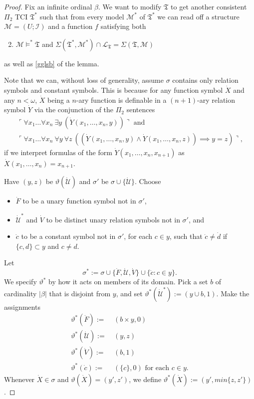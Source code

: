 \documentclass[12pt, twoside]{memoir}
\numberwithin{equation}{section}
\theoremstyle{definition}
\theoremstyle{remark}
\theoremstyle{definition}
\theoremstyle{definition}
\theoremstyle{definition}
\theoremstyle{remark}
\begin{document}
\begin{proof}
Fix an infinite ordinal $\beta$. We want to modify $\mathfrak{T}$ to get another consistent $\Pi_2$ TCI $\mathfrak{T}^*$ such that from every model $\mathcal{M}^*$ of $\mathfrak{T}^*$ we can read off a structure $\mathcal{M} = (U; \mathcal{I})$ and a function $f$ satisfying both
\begin{enumerate}[label=(\alph*)']
    \setcounter{enumi}{1}
    \item\label{gglsb'} $\mathcal{M} \models^* \mathfrak{T}$ and $\Sigma(\mathfrak{T}^*, \mathcal{M}^*) \cap \mathcal{L}_{\mathfrak{T}} = \Sigma(\mathfrak{T}, \mathcal{M})$
\end{enumerate}
as well as \ref{gglsb} of the lemma. 

Note that we can, without loss of generality, assume $\sigma$ contains only relation symbols and constant symbols. This is because for any function symbol $\dot{X}$ and any $n < \omega$, $\dot{X}$ being a $n$-ary function is definable in a $(n+1)$-ary relation symbol $\dot{Y}$ via the conjunction of the $\Pi_2$ sentences
\begin{gather*}
    \ulcorner \forall x_1 \dots \forall x_n \ \exists y \ (\dot{Y}(x_1, \dots, x_n, y)) \urcorner \text{ and} \\
    \ulcorner \forall x_1 \dots \forall x_n \ \forall y \ \forall z \ ((\dot{Y} (x_1, \dots, x_n, y) \wedge \dot{Y} (x_1, \dots, x_n, z)) \implies y = z) \urcorner \text{,} 
\end{gather*}
if we interpret formulas of the form $\dot{Y} (x_1, \dots, x_n, x_{n+1})$ as $\dot{X} (x_1, \dots, x_n) = x_{n+1}$.

Have $(y, z)$ be $\vartheta(\dot{\mathcal{U}})$ and $\sigma'$ be $\sigma \cup \{\dot{\mathcal{U}}\}$. Choose 
\begin{itemize}
    \item $\dot{F}$ to be a unary function symbol not in $\sigma'$,
    \item $\dot{\mathcal{U}}^*$ and $\dot{V}$ to be distinct unary relation symbols not in $\sigma'$, and
    \item $\dot{c}$ to be a constant symbol not in $\sigma'$, for each $c \in y$, such that $\dot{c} \neq \dot{d}$ if $\{c, d\} \subset y$ and $c \neq d$.
\end{itemize}
Let $$\sigma^* := \sigma \cup \{\dot{F}, \dot{\mathcal{U}}, \dot{V}\} \cup \{\dot{c} : c \in y\}.$$ We specify $\vartheta^*$ by how it acts on members of its domain. Pick a set $b$ of cardinality $|\beta|$ that is disjoint from $y$, and set $\vartheta^*(\dot{\mathcal{U}}^*) := (y \cup b, 1)$. Make the assignments
\begin{align*}
    \vartheta^*(\dot{F}) := \ & (b \times y, 0) \\
    \vartheta^*(\dot{\mathcal{U}}) := \ & (y, z) \\
    \vartheta^*(\dot{V}) := \ & (b, 1) \\
    \vartheta^*(\dot{c}) := \ & (\{c\}, 0) \text{ for each } c \in y \text{.}
\end{align*}
Whenever $\dot{X} \in \sigma$ and $\vartheta(\dot{X}) = (y', z')$, we define $\vartheta^*(\dot{X}) := (y', min\{z, z'\})$.


\end{proof}
\end{document}
